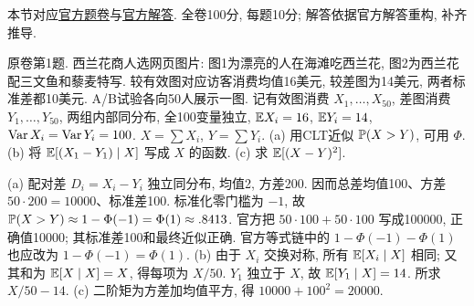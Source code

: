 本节对应\href{https://ocw.mit.edu/courses/18-600-probability-and-random-variables-fall-2019/resources/mit18_600f19_final_2019/}{官方题卷}与\href{https://ocw.mit.edu/courses/18-600-probability-and-random-variables-fall-2019/resources/mit18_600f19_final_2019_soln/}{官方解答}. 全卷100分, 每题10分; 解答依据官方解答重构, 补齐推导.

\begin{exercise}\label{ex:fl19-1}
原卷第1题. 西兰花商人选网页图片: 图1为漂亮的人在海滩吃西兰花, 图2为西兰花配三文鱼和藜麦特写. 较有效图对应访客消费均值16美元, 较差图为14美元, 两者标准差都10美元. A/B试验各向50人展示一图. 记有效图消费 $X_1,\ldots,X_{50}$, 差图消费 $Y_1,\ldots,Y_{50}$, 两组内部同分布, 全100变量独立, $\mathbb E X_i=16$, $\mathbb E Y_i=14$, $\operatorname{Var} X_i=\operatorname{Var} Y_i=100$. $X=\sum X_i$, $Y=\sum Y_i$. (a) 用CLT近似 $\mathbb P(X>Y)$, 可用 $\Phi$. (b) 将 $\mathbb E[(X_1-Y_1)\mid X]$ 写成 $X$ 的函数. (c) 求 $\mathbb E[(X-Y)^2]$.
\end{exercise}
\begin{solution}
(a)\label{sol:fl19-1-a} 配对差 $D_i=X_i-Y_i$ 独立同分布, 均值2, 方差200. 因而总差均值100、方差 $50\cdot200=10000$、标准差100. 标准化零门槛为 $-1$, 故 $\mathbb P(X>Y)\approx1-\Phi(-1)=\Phi(1)\approx.8413$. 官方把 $50\cdot100+50\cdot100$ 写成100000, 正确值10000; 其标准差100和最终近似正确. 官方等式链中的 $1-\Phi(-1)-\Phi(1)$ 也应改为 $1-\Phi(-1)=\Phi(1)$.
(b)\label{sol:fl19-1-b} 由于 $X_i$ 交换对称, 所有 $\mathbb E[X_i\mid X]$ 相同; 又其和为 $\mathbb E[X\mid X]=X$, 得每项为 $X/50$. $Y_1$ 独立于 $X$, 故 $\mathbb E[Y_1\mid X]=14$. 所求 $X/50-14$.
(c)\label{sol:fl19-1-c} 二阶矩为方差加均值平方, 得 $10000+100^2=20000$.
\end{solution}

